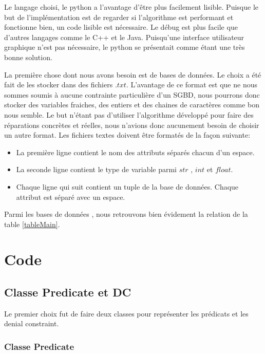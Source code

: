 \documentclass[letterpaper, 12pt]{report}
\theoremstyle{definition}
\begin{document}
Le langage choisi, le python a l'avantage d'être plus facilement lisible. Puisque le but de l'implémentation est de regarder si l'algorithme est performant et fonctionne bien, un code lisible est nécessaire. Le débug est plus facile que d'autres langages comme le C++ et le Java. Puisqu'une interface utilisateur graphique n'est pas nécessaire, le python se présentait comme étant une très bonne solution.

La première chose dont nous avons besoin est de bases de données. Le choix a été fait de les stocker dans des fichiers $.txt$. L'avantage de ce format est que ne nous sommes soumis à aucune contrainte particulière d'un SGBD, nous pourrons donc stocker des variables fraiches, des entiers et des chaines de caractères comme bon nous semble. Le but n'étant pas d'utiliser l'algorithme développé pour faire des réparations concrètes et réelles, nous n'avions donc aucunement besoin de choisir un autre format. Les fichiers textes doivent être formatés de la façon suivante:
\begin{itemize}


\item La première ligne contient le nom des attributs séparés chacun d'un espace.
\item La seconde ligne contient le type de variable parmi $str$ , $int$ et $float$.
\item Chaque ligne qui suit contient un tuple de la base de données. Chaque attribut est séparé avec un espace.

\end{itemize}

Parmi les bases de données , nous retrouvons bien évidement la relation de la table \ref{tableMain}.

\section{Code}

\subsection{Classe Predicate et DC}

Le premier choix fut de faire deux classes pour représenter les prédicats et les denial constraint.

\subsubsection{Classe Predicate}
\end{document}
